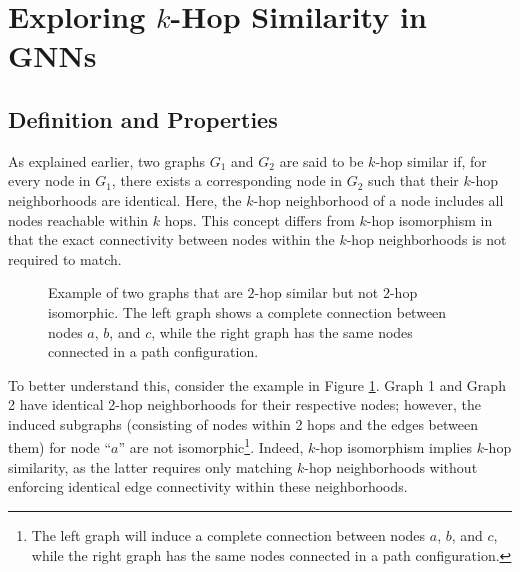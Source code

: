 \section{Exploring $k$-Hop Similarity in GNNs}
\subsection{Definition and Properties}

As explained earlier, two graphs $G_1$ and $G_2$ are said to be $k$-hop similar if, for every node in $G_1$, there exists a corresponding node in $G_2$ such that their $k$-hop neighborhoods are identical. Here, the $k$-hop neighborhood of a node includes all nodes reachable within $k$ hops. This concept differs from $k$-hop isomorphism in that the exact connectivity between nodes within the $k$-hop neighborhoods is not required to match.

\begin{figure}[H]
\vskip 0.2in
\begin{center}
    \end{center}
    \caption{Example of two graphs that are $2$-hop similar but not $2$-hop isomorphic. The left graph shows a complete connection between nodes $a$, $b$, and $c$, while the right graph has the same nodes connected in a path configuration.}
    \label{fig:two_hop_iso}
\end{figure}
To better understand this, consider the example in Figure \ref{fig:two_hop_iso}. Graph 1 and Graph 2 have identical 2-hop neighborhoods for their respective nodes; however, the induced subgraphs (consisting of nodes within 2 hops and the edges between them) for node ``$a$'' are not isomorphic\footnote{The left graph will induce a complete connection between nodes $a$, $b$, and $c$, while the right graph has the same nodes connected in a path configuration.}. Indeed, $k$-hop isomorphism implies $k$-hop similarity, as the latter requires only matching $k$-hop neighborhoods without enforcing identical edge connectivity within these neighborhoods.

